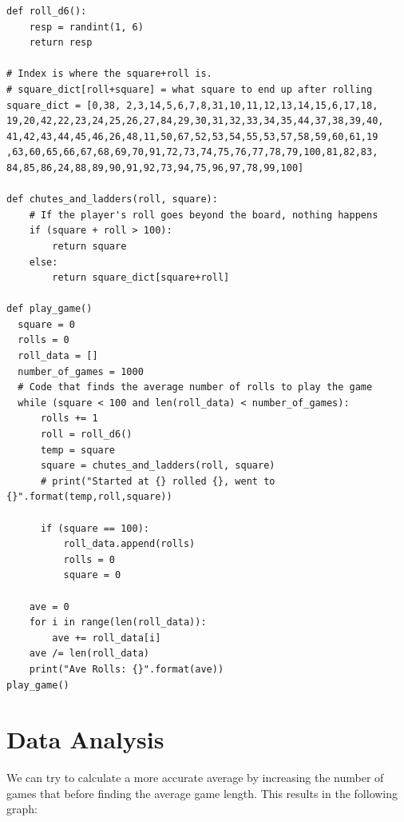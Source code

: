 \documentclass[12pt]{article} %
\begin{document}
\begin{verbatim}
def roll_d6():
    resp = randint(1, 6)
    return resp

# Index is where the square+roll is.
# square_dict[roll+square] = what square to end up after rolling
square_dict = [0,38, 2,3,14,5,6,7,8,31,10,11,12,13,14,15,6,17,18,
19,20,42,22,23,24,25,26,27,84,29,30,31,32,33,34,35,44,37,38,39,40,
41,42,43,44,45,46,26,48,11,50,67,52,53,54,55,53,57,58,59,60,61,19
,63,60,65,66,67,68,69,70,91,72,73,74,75,76,77,78,79,100,81,82,83,
84,85,86,24,88,89,90,91,92,73,94,75,96,97,78,99,100]

def chutes_and_ladders(roll, square):
    # If the player's roll goes beyond the board, nothing happens
    if (square + roll > 100):
        return square
    else:
        return square_dict[square+roll]

def play_game()
  square = 0
  rolls = 0
  roll_data = []
  number_of_games = 1000
  # Code that finds the average number of rolls to play the game
  while (square < 100 and len(roll_data) < number_of_games):
      rolls += 1
      roll = roll_d6()
      temp = square
      square = chutes_and_ladders(roll, square)
      # print("Started at {} rolled {}, went to {}".format(temp,roll,square))

      if (square == 100):
          roll_data.append(rolls)
          rolls = 0
          square = 0

    ave = 0
    for i in range(len(roll_data)):
        ave += roll_data[i]
    ave /= len(roll_data)
    print("Ave Rolls: {}".format(ave))
play_game()

\end{verbatim}

\section*{Data Analysis}
We can try to calculate a more accurate average by increasing the number of games that before finding the average game length. This results in the following graph:
\end{document}
